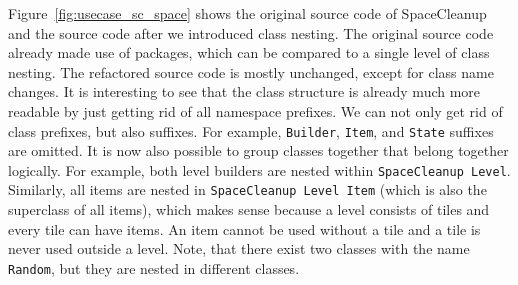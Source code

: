 Figure~\ref{fig:usecase_sc_space} shows the original source code of SpaceCleanup and the source code after we introduced class nesting. The original source code already made use of packages, which can be compared to a single level of class nesting. The refactored source code is mostly unchanged, except for class name changes. It is interesting to see that the class structure is already much more readable by just getting rid of all namespace prefixes. We can not only get rid of class prefixes, but also suffixes. For example, \texttt{Builder}, \texttt{Item}, and \texttt{State} suffixes are omitted. It is now also possible to group classes together that belong together logically. For example, both level builders are nested within \texttt{SpaceCleanup Level}. Similarly, all items are nested in \texttt{SpaceCleanup Level Item} (which is also the superclass of all items), which makes sense because a level consists of tiles and every tile can have items. An item cannot be used without a tile and a tile is never used outside a level. Note, that there exist two classes with the name \texttt{Random}, but they are nested in different classes.


